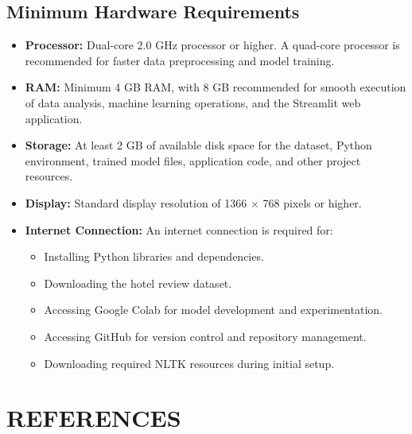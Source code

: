 \documentclass[12pt,a4paper]{report}
\begin{document}
\vspace{0.4cm}

\section{Minimum Hardware Requirements}

\begin{itemize}

    \item \textbf{Processor:}
    Dual-core 2.0 GHz processor or higher.
    A quad-core processor is recommended for faster
    data preprocessing and model training.

    \item \textbf{RAM:}
    Minimum 4 GB RAM, with 8 GB recommended
    for smooth execution of data analysis,
    machine learning operations, and the
    Streamlit web application.

    \item \textbf{Storage:}
    At least 2 GB of available disk space
    for the dataset, Python environment,
    trained model files, application code,
    and other project resources.

    \item \textbf{Display:}
    Standard display resolution of
    1366 $\times$ 768 pixels or higher.

    \item \textbf{Internet Connection:}
    An internet connection is required for:

    \begin{itemize}
        \item Installing Python libraries and dependencies.
        \item Downloading the hotel review dataset.
        \item Accessing Google Colab for model development
        and experimentation.
        \item Accessing GitHub for version control
        and repository management.
        \item Downloading required NLTK resources
        during initial setup.
    \end{itemize}

\end{itemize}


\newpage
\chapter{REFERENCES}
\end{document}
